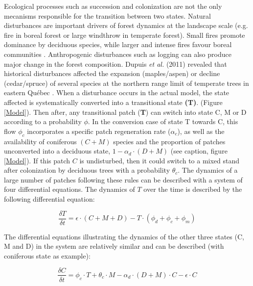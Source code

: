 Ecological processes
such as succession and colonization are not the only mecanisms responsible for
the transition between two states. Natural disturbances are important
drivers of forest dynamics at the landscape scale (e.g. fire in boreal forest
or large windthrow in temperate forest). Small fires promote dominance by
deciduous species, while larger and intense fires favour boreal communities
\cite{Bergeron2004}. Anthropogenic disturbances such as logging can also
produce major change in the forest composition. Dupuis \textit{et al.} (2011)
revealed that historical disturbances affected the  expansion (maples/aspen)
or decline (cedar/spruce) of several species at the northern range limit of
temperate trees in eastern Québec \cite{Dupuis2011}. When a disturbance occurs
in the actual model, the state affected is systematically converted into a
transitional state \textbf{(T)}. (Figure \ref{Model}).  Then after, any
transitional patch (\textbf{T}) can switch into state C, M or D
according to a probability $\phi$. In the conversion case of state T
towards C, 
this flow $\phi_c$ incorporates a specific patch regeneration rate
($\alpha_c$), as well as the availability of coniferous $(C + M)$ species and
the proportion of patches unconverted into a deciduous state, $1- \alpha_d
\cdot (D + M)$ (see caption, figure \ref{Model}). If this patch $C$ is
undisturbed, then it could switch to a mixed stand after colonization by
deciduous trees with a probability $\theta_c$. The dynamics of a large number of patches following these rules can
be described with a system of four differential equations. The dynamics of
$T$ over the time is described by the following differential equation:

\begin{equation}
 	\frac{\delta T}{\delta t} =\epsilon \cdot (C+M+D) - T \cdot (\phi_d + \phi_c + \phi_m)
\end{equation}

The differential equations illustrating the dynamics of the other three states
(C, M and D) in the system are relatively similar and can be described (with
coniferous state as example):

\begin{equation}
	\frac{\delta C}{\delta t} = \phi_c \cdot T + \theta_c \cdot M -\alpha_d \cdot (D+M)\cdot C - \epsilon \cdot C
\end{equation}


